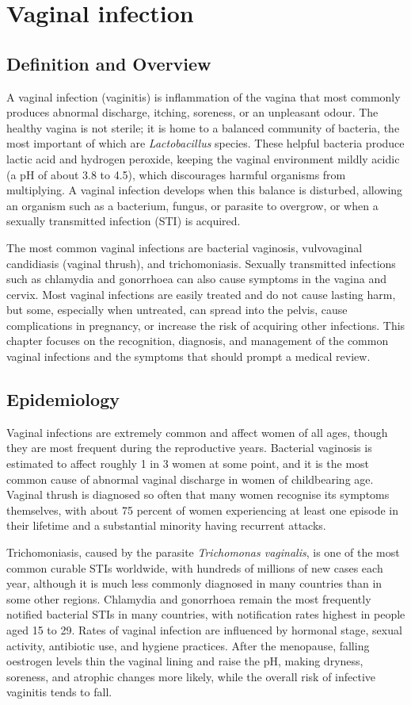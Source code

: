 \chapter{Vaginal infection}

\section*{Definition and Overview}
A vaginal infection (vaginitis) is inflammation of the vagina that most commonly produces abnormal discharge, itching, soreness, or an unpleasant odour. The healthy vagina is not sterile; it is home to a balanced community of bacteria, the most important of which are \textit{Lactobacillus} species. These helpful bacteria produce lactic acid and hydrogen peroxide, keeping the vaginal environment mildly acidic (a pH of about 3.8 to 4.5), which discourages harmful organisms from multiplying. A vaginal infection develops when this balance is disturbed, allowing an organism such as a bacterium, fungus, or parasite to overgrow, or when a sexually transmitted infection (STI) is acquired.

The most common vaginal infections are bacterial vaginosis, vulvovaginal candidiasis (vaginal thrush), and trichomoniasis. Sexually transmitted infections such as chlamydia and gonorrhoea can also cause symptoms in the vagina and cervix. Most vaginal infections are easily treated and do not cause lasting harm, but some, especially when untreated, can spread into the pelvis, cause complications in pregnancy, or increase the risk of acquiring other infections. This chapter focuses on the recognition, diagnosis, and management of the common vaginal infections and the symptoms that should prompt a medical review.

\section*{Epidemiology}
Vaginal infections are extremely common and affect women of all ages, though they are most frequent during the reproductive years. Bacterial vaginosis is estimated to affect roughly 1 in 3 women at some point, and it is the most common cause of abnormal vaginal discharge in women of childbearing age. Vaginal thrush is diagnosed so often that many women recognise its symptoms themselves, with about 75 percent of women experiencing at least one episode in their lifetime and a substantial minority having recurrent attacks.

Trichomoniasis, caused by the parasite \textit{Trichomonas vaginalis}, is one of the most common curable STIs worldwide, with hundreds of millions of new cases each year, although it is much less commonly diagnosed in many countries than in some other regions. Chlamydia and gonorrhoea remain the most frequently notified bacterial STIs in many countries, with notification rates highest in people aged 15 to 29. Rates of vaginal infection are influenced by hormonal stage, sexual activity, antibiotic use, and hygiene practices. After the menopause, falling oestrogen levels thin the vaginal lining and raise the pH, making dryness, soreness, and atrophic changes more likely, while the overall risk of infective vaginitis tends to fall.


